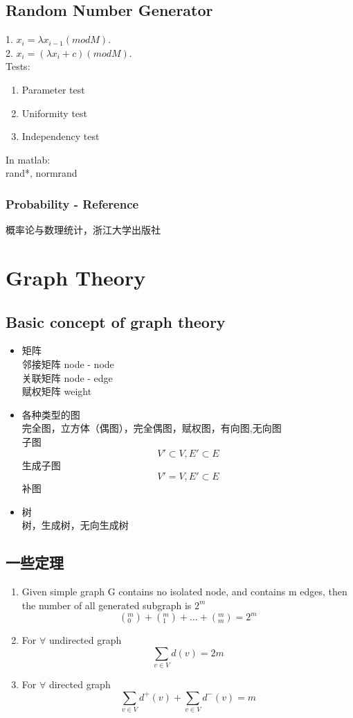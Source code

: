 \documentclass[12pt,a4paper]{article} \usepackage{kurier}
\begin{document}
\begin{CJK}{UTF8}{gkai}
\begin{multicols}{2}
	\subsection{Random Number Generator}
		1. $ x_i = \lambda x_{i-1} (mod M) $.\\
		2. $ x_i = (\lambda x_i + c)(mod M) $.\\
		Tests:
		\begin{enumerate}
		\item Parameter test
		\item Uniformity test
		\item Independency test
		\end{enumerate}
		In matlab:\\
			rand*, normrand
	\subsubsection{Probability - Reference}
		\begin{thebibliography}{9}
		 概率论与数理统计，浙江大学出版社
		\end{thebibliography}
\end{multicols}

\newpage
\section{Graph Theory}
\begin{multicols}{2}
	\subsection{Basic concept of graph theory}
		\begin{itemize}	
		\item 矩阵\\
			邻接矩阵 node - node\\
			关联矩阵 node - edge\\
			赋权矩阵 weight
		\item 各种类型的图\\
			完全图，立方体（偶图），完全偶图，赋权图，有向图,无向图\\
			子图
				\[ V' \subset V, E' \subset E \]
			生成子图
				\[ V' = V, E' \subset E \]
			补图
		\item 树\\
			树，生成树，无向生成树
		\end{itemize}
	\subsection{一些定理}
		\begin{enumerate}
		\item Given simple graph G contains no isolated node,
			and contains m edges, then the number of all generated
			subgraph is $2^m$
			\[ (_0^m) + (_1^m) + \ldots + (_m^m) = 2^m \]
		\item For $\forall$ undirected graph
			\[ \sum_{v \in V} d(v) = 2m \]
		\item For $\forall$ directed graph
			\[ \sum_{v \in V} d^+(v) + \sum_{v \in V} d^-(v) = m \]
		\end{enumerate}

\end{multicols}
\end{CJK}
\end{document}
